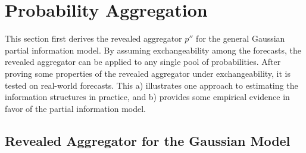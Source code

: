 \documentclass[11pt]{article}
\theoremstyle{definition}
\theoremstyle{definition}
\begin{document}
\section{Probability Aggregation}
\label{aggregation}

This section first derives the revealed aggregator $p''$ for 
the general Gaussian partial information model. By assuming exchangeability among the forecasts, the revealed aggregator can be applied to any single pool of probabilities. After proving some properties of the revealed aggregator under exchangeability, it is tested on real-world forecasts. This a) illustrates one approach to estimating the information structures in practice, and b) provides some empirical evidence in favor of the partial information model. 

\subsection{Revealed Aggregator for the Gaussian Model}
\end{document}
